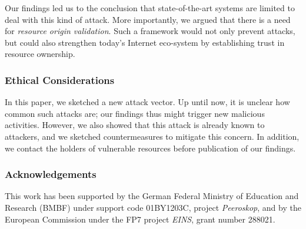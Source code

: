 \documentclass{llncs}
\begin{document}
Our findings led us to the conclusion that state-of-the-art systems are limited
to deal with this kind of attack. More importantly, we argued that there is a
need for \textit{resource origin validation}. Such a framework would not only
prevent attacks, but could also strengthen today's Internet eco-system by
establishing trust in resource ownership.


\clearpage
\subsubsection{Ethical Considerations} In this paper, we sketched a new attack
vector. Up until now, it is unclear how common such attacks are; our findings
thus might trigger new malicious activities. However, we also showed that this
attack is already known to attackers, and we sketched countermeasures to
mitigate this concern. In addition, we contact the holders of vulnerable
resources before publication of our findings.

\subsubsection{Acknowledgements} This work has been supported by the German
Federal Ministry of Education and Research (BMBF) under support code 01BY1203C,
project \textit{Peeroskop}, and by the European Commission under the FP7
project \textit{EINS}, grant number 288021.
\end{document}
